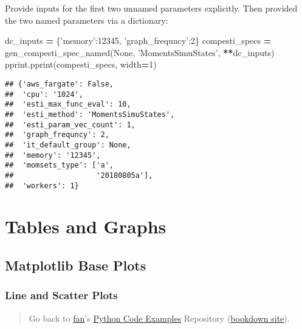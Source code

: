 \documentclass[
]{book}
\newenvironment{Shaded}{\begin{snugshade}}{\end{snugshade}}
\newcommand{\DecValTok}[1]{\textcolor[rgb]{0.00,0.00,0.81}{#1}}
\newcommand{\NormalTok}[1]{#1}
\newcommand{\OperatorTok}[1]{\textcolor[rgb]{0.81,0.36,0.00}{\textbf{#1}}}
\newcommand{\StringTok}[1]{\textcolor[rgb]{0.31,0.60,0.02}{#1}}
\newcommand{\VariableTok}[1]{\textcolor[rgb]{0.00,0.00,0.00}{#1}}
\begin{document}
Provide inputs for the first two unnamed parameters explicitly. Then provided the two named parameters via a dictionary:

\begin{Shaded}
\begin{Highlighting}[]
\NormalTok{dc_inputs }\OperatorTok{=}\NormalTok{ \{}\StringTok{'memory'}\NormalTok{:}\DecValTok{12345}\NormalTok{, }\StringTok{'graph_frequncy'}\NormalTok{:}\DecValTok{2}\NormalTok{\}}
\NormalTok{compesti_specs }\OperatorTok{=}\NormalTok{ gen_compesti_spec_named(}\VariableTok{None}\NormalTok{, }\StringTok{'MomentsSimuStates'}\NormalTok{, }\OperatorTok{**}\NormalTok{dc_inputs)}
\NormalTok{pprint.pprint(compesti_specs, width}\OperatorTok{=}\DecValTok{1}\NormalTok{)}
\end{Highlighting}
\end{Shaded}

\begin{verbatim}
## {'aws_fargate': False,
##  'cpu': '1024',
##  'esti_max_func_eval': 10,
##  'esti_method': 'MomentsSimuStates',
##  'esti_param_vec_count': 1,
##  'graph_frequncy': 2,
##  'it_default_group': None,
##  'memory': '12345',
##  'momsets_type': ['a',
##                   '20180805a'],
##  'workers': 1}
\end{verbatim}

\hypertarget{tables-and-graphs}{%
\chapter{Tables and Graphs}\label{tables-and-graphs}}

\hypertarget{matplotlib-base-plots}{%
\section{Matplotlib Base Plots}\label{matplotlib-base-plots}}

\hypertarget{line-and-scatter-plots}{%
\subsection{Line and Scatter Plots}\label{line-and-scatter-plots}}

\begin{quote}
Go back to \href{http://fanwangecon.github.io/}{fan}'s \href{https://fanwangecon.github.io/pyfan/}{Python Code Examples} Repository (\href{https://fanwangecon.github.io/pyfan/bookdown}{bookdown site}).
\end{quote}
\end{document}

